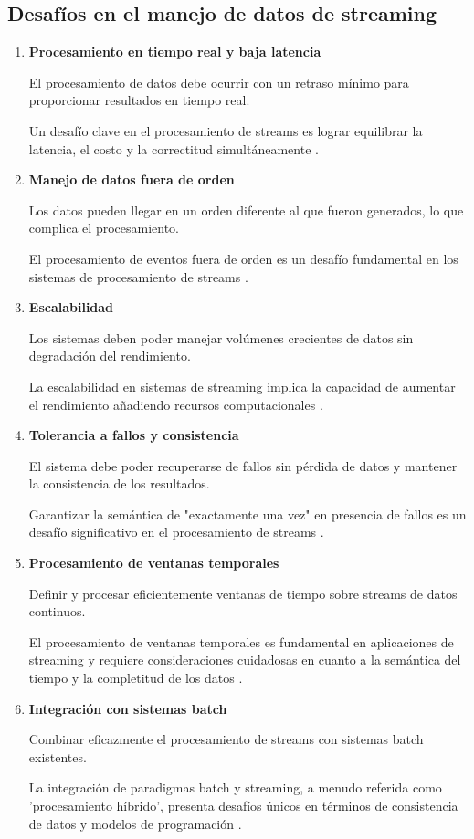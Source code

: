 \subsection{Desafíos en el manejo de datos de streaming}

\begin{enumerate}
    \item \textbf{Procesamiento en tiempo real y baja latencia}
    
    El procesamiento de datos debe ocurrir con un retraso mínimo para proporcionar resultados en tiempo real.
    
    Un desafío clave en el procesamiento de streams es lograr equilibrar la latencia, el costo y la correctitud simultáneamente \parencite{akidau2015dataflow}.

    \item \textbf{Manejo de datos fuera de orden}
    
    Los datos pueden llegar en un orden diferente al que fueron generados, lo que complica el procesamiento.
    
    El procesamiento de eventos fuera de orden es un desafío fundamental en los sistemas de procesamiento de streams \parencite[p.~87]{flink}.

    \item \textbf{Escalabilidad}
    
    Los sistemas deben poder manejar volúmenes crecientes de datos sin degradación del rendimiento.
    
    La escalabilidad en sistemas de streaming implica la capacidad de aumentar el rendimiento añadiendo recursos computacionales \parencite{samurai}.

    \newpage
    \item \textbf{Tolerancia a fallos y consistencia}
    
    El sistema debe poder recuperarse de fallos sin pérdida de datos y mantener la consistencia de los resultados.
    
    Garantizar la semántica de "exactamente una vez" en presencia de fallos es un desafío significativo en el procesamiento de streams \parencite{carbone2015apache}.

    \item \textbf{Procesamiento de ventanas temporales}
    
    Definir y procesar eficientemente ventanas de tiempo sobre streams de datos continuos.
    
    El procesamiento de ventanas temporales es fundamental en aplicaciones de streaming y requiere consideraciones cuidadosas en cuanto a la semántica del tiempo y la completitud de los datos \parencite{akidau2015dataflow}.

    \item \textbf{Integración con sistemas batch}
    
    Combinar eficazmente el procesamiento de streams con sistemas batch existentes.
    
    La integración de paradigmas batch y streaming, a menudo referida como 'procesamiento híbrido', presenta desafíos únicos en términos de consistencia de datos y modelos de programación \parencite{carbone2015apache}.
\end{enumerate}
\newpage